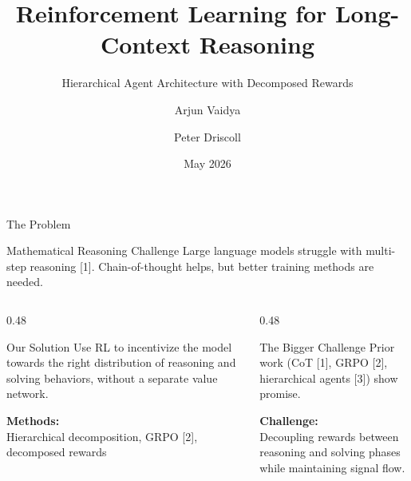 \documentclass[aspectratio=169,11pt]{beamer}
\title{Reinforcement Learning for Long-Context Reasoning}
\subtitle{Hierarchical Agent Architecture with Decomposed Rewards}
\author{Arjun Vaidya \and Peter Driscoll}
\date{May 2026}
\begin{document}
\begin{frame}
  \titlepage
\end{frame}

\begin{frame}{The Problem}
\begin{block}{Mathematical Reasoning Challenge}
Large language models struggle with multi-step reasoning [1]. \newline
Chain-of-thought helps, but better training methods are needed.
\end{block}

\vspace{0.8em}
\begin{columns}[T,onlytextwidth]
  \begin{column}{0.48\textwidth}
    \begin{block}{Our Solution}
      Use RL to incentivize the model towards the right distribution of reasoning and solving behaviors, without a separate value network.

      \vspace{0.6em}
      \textbf{Methods:} \\ Hierarchical decomposition, GRPO [2], decomposed rewards
      \vfill
    \end{block}
  \end{column}
  \begin{column}{0.48\textwidth}
    \begin{block}{The Bigger Challenge}
      Prior work (CoT [1], GRPO [2], hierarchical agents [3]) show promise.

      \vspace{1.5em}
      \textbf{Challenge:} \\ Decoupling rewards between reasoning and solving phases while maintaining signal flow.
    \end{block}
  \end{column}
\end{columns}
\end{frame}
\end{document}
